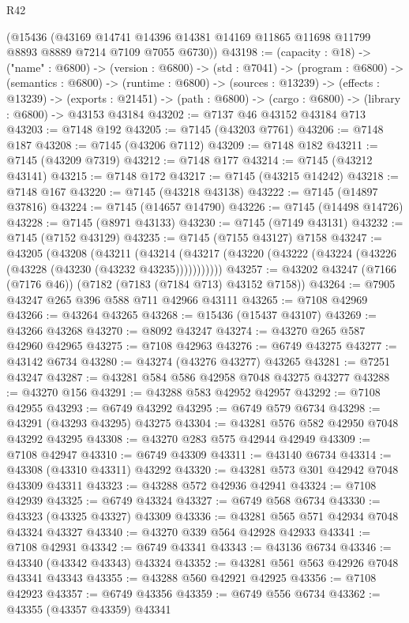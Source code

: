 \begin{lexlean}{R42}
\begin{coremodule}
{    (@15436
      (@43169 @14741 @14396 @14381 @14169 @11865 @11698 @11799 @8893 @8889 @7214 @7109 @7055 @6730))
@43198 := (capacity : @18) ->
  ("name" : @6800) ->
  (version : @6800) ->
  (std : @7041) ->
  (program : @6800) ->
  (semantics : @6800) ->
  (runtime : @6800) ->
  (sources : @13239) ->
  (effects : @13239) ->
  (exports : @21451) -> (path : @6800) -> (cargo : @6800) -> (library : @6800) -> @43153 @43184
@43202 := @7137 @46 @43152 @43184 @713
@43203 := @7148 @192
@43205 := @7145 (@43203 @7761)
@43206 := @7148 @187
@43208 := @7145 (@43206 @7112)
@43209 := @7148 @182
@43211 := @7145 (@43209 @7319)
@43212 := @7148 @177
@43214 := @7145 (@43212 @43141)
@43215 := @7148 @172
@43217 := @7145 (@43215 @14242)
@43218 := @7148 @167
@43220 := @7145 (@43218 @43138)
@43222 := @7145 (@14897 @37816)
@43224 := @7145 (@14657 @14790)
@43226 := @7145 (@14498 @14726)
@43228 := @7145 (@8971 @43133)
@43230 := @7145 (@7149 @43131)
@43232 := @7145 (@7152 @43129)
@43235 := @7145 (@7155 @43127) @7158
@43247 := @43205
    (@43208
      (@43211
        (@43214 (@43217 (@43220 (@43222 (@43224 (@43226 (@43228 (@43230 (@43232 @43235)))))))))))
@43257 := @43202 @43247 (@7166 (@7176 @46)) (@7182 (@7183 (@7184 @713) @43152 @7158))
@43264 := @7905 @43247 @265 @396 @588 @711 @42966 @43111
@43265 := @7108 @42969
@43266 := @43264 @43265
@43268 := @15436 (@15437 @43107)
@43269 := @43266 @43268
@43270 := @8092 @43247
@43274 := @43270 @265 @587 @42960 @42965
@43275 := @7108 @42963
@43276 := @6749 @43275
@43277 := @43142 @6734
@43280 := @43274 (@43276 @43277) @43265
@43281 := @7251 @43247
@43287 := @43281 @584 @586 @42958 @7048 @43275 @43277
@43288 := @43270 @156
@43291 := @43288 @583 @42952 @42957
@43292 := @7108 @42955
@43293 := @6749 @43292
@43295 := @6749 @579 @6734
@43298 := @43291 (@43293 @43295) @43275
@43304 := @43281 @576 @582 @42950 @7048 @43292 @43295
@43308 := @43270 @283 @575 @42944 @42949
@43309 := @7108 @42947
@43310 := @6749 @43309
@43311 := @43140 @6734
@43314 := @43308 (@43310 @43311) @43292
@43320 := @43281 @573 @301 @42942 @7048 @43309 @43311
@43323 := @43288 @572 @42936 @42941
@43324 := @7108 @42939
@43325 := @6749 @43324
@43327 := @6749 @568 @6734
@43330 := @43323 (@43325 @43327) @43309
@43336 := @43281 @565 @571 @42934 @7048 @43324 @43327
@43340 := @43270 @339 @564 @42928 @42933
@43341 := @7108 @42931
@43342 := @6749 @43341
@43343 := @43136 @6734
@43346 := @43340 (@43342 @43343) @43324
@43352 := @43281 @561 @563 @42926 @7048 @43341 @43343
@43355 := @43288 @560 @42921 @42925
@43356 := @7108 @42923
@43357 := @6749 @43356
@43359 := @6749 @556 @6734
@43362 := @43355 (@43357 @43359) @43341
}
\end{coremodule}
\end{lexlean}
